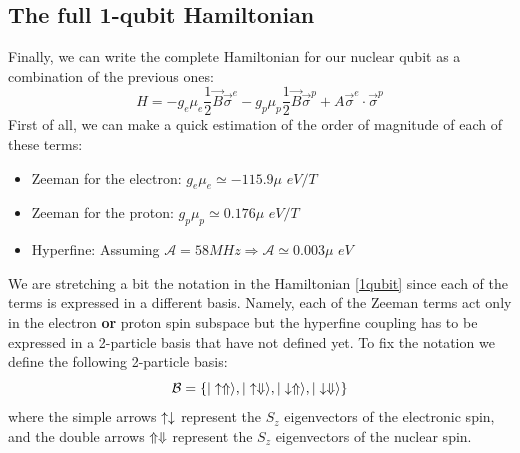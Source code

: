 \subsection{The full 1-qubit Hamiltonian}
Finally, we can write the complete Hamiltonian for our nuclear qubit as a combination of the previous ones:
\begin{equation}
  H = -g_e\mu_e\frac{1}{2}\vec{B}\vec{\sigma}^e
      -g_p\mu_p\frac{1}{2}\vec{B}\vec{\sigma}^p
      +A\vec{\sigma}^e\cdot\vec{\sigma}^p
\label{1qubit}
\end{equation}
First of all, we can make a quick estimation of the order of magnitude of each of these terms:
\begin{itemize}
  \item Zeeman for the electron: $g_e\mu_e\simeq -115.9\mu$ $eV/T$
  \item Zeeman for the proton: $g_p\mu_p\simeq  0.176\mu$ $eV/T$
  \item Hyperfine: Assuming
  $\mathcal{A}=58MHz\Rightarrow\mathcal{A}\simeq
0.003\mu$ $eV$
\end{itemize}
We are stretching a bit the notation in the Hamiltonian \eqref{1qubit} since each of the terms is expressed in a different basis. Namely, each of the Zeeman terms act only in the electron \textbf{or} proton spin subspace but the hyperfine coupling has to be expressed in a 2-particle basis that have not defined yet.
To fix the notation we define the following 2-particle basis:
\begin{equation}
  \mathcal{B}=\left\{|\uparrow\Uparrow\rangle,|\uparrow\Downarrow\rangle,
                     |\downarrow\Uparrow\rangle,|\downarrow\Downarrow\rangle\right\}
\label{basis}
\end{equation}
where the simple arrows $\uparrow\downarrow$ represent the $S_z$ eigenvectors of the electronic spin, and the double arrows $\Uparrow\Downarrow$ represent the $S_z$ eigenvectors of the nuclear spin.

